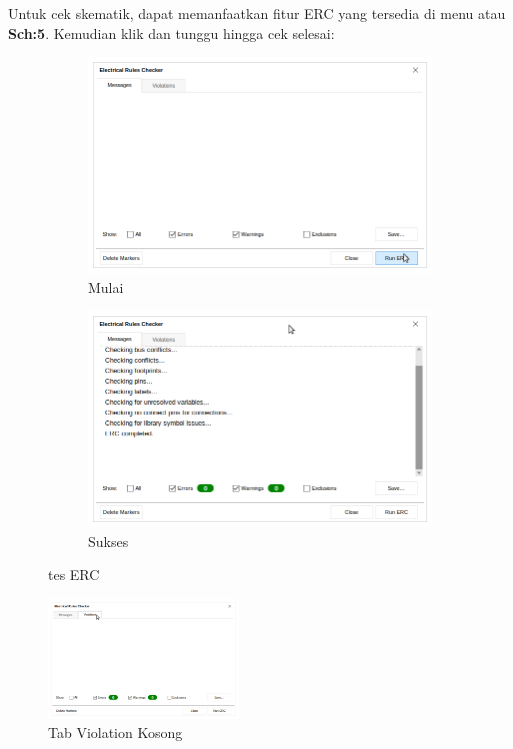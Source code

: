 \documentclass[12pt]{book}
\begin{document}
	Untuk cek skematik, dapat memanfaatkan fitur ERC yang tersedia di menu  atau \textbf{Sch:5}.
	Kemudian klik  dan tunggu hingga cek selesai:
	\begin{figure}[!ht]
		\centering
		\begin{subfigure}[t]{0.45\textwidth}
			\includegraphics[width=\textwidth]{images/sch/erc_0}
			\caption{Mulai}
		\end{subfigure}
		\begin{subfigure}[t]{0.45\textwidth}
			\includegraphics[width=\textwidth]{images/sch/erc_1}
			\caption{Sukses}
		\end{subfigure}
		\caption{tes ERC}
	\end{figure}

	\begin{figure}[!ht]
		\centering
		\includegraphics[width=0.45\textwidth]{images/sch/erc_2}
		\caption{Tab Violation Kosong}
	\end{figure}
\end{document}
